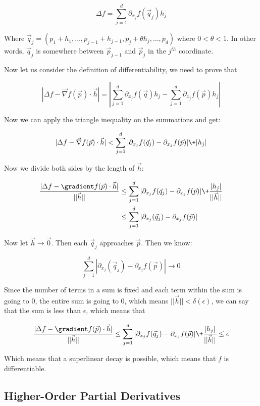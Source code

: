 \documentclass[11 pt, twoside]{article}
\begin{document}
$$\Delta f = \sum_{j=1}^d \partial_{x_j} f(\vec{q}_j) h_j$$

Where $\vec{q}_j = (p_1 + h_1, \dots, p_{j-1} + h_{j-1}, p_j + \theta h_j,
\dots, p_d)$ where $0 < \theta < 1$. In other words, $\vec{q}_j$ is somewhere
between $\vec{p}_{j-1}$ and $\vec{p}_{j}$ in the $j^{th}$ coordinate.

Now let us consider the definition of differentiability, we need to prove that 


$$|\Delta f - \vec{\nabla}f(\vec{p}) \cdot \vec{h}| = |\sum_{j = 1}^d
\partial_{x_j} f(\vec{q}) h_j - \sum_{j = 1}^d \partial_{x_j} f(\vec{p}) h_j|$$

Now we can apply the triangle inequality on the summations and get:

$$|\Delta f - \vec{\nabla}f(\vec{p}) \cdot \vec{h}| < \sum_{j=1}^d |\partial_{x_j} f(\vec{q}_j) - \partial_{x_j} f(\vec{p})|
\+ |h_j|$$

Now we divide both sides by the length of $\vec{h}$:

\begin{align*}
\frac{|\Delta f - \gradient f(\vec{p}) \cdot \vec{h}|}{||\vec{h}||} &\leq
\sum_{j=1}^d |\partial_{x_j} f(\vec{q}_j) - \partial_{x_j} f(\vec{p})| \+
\frac{|h_j|}{||\vec{h}||}\\
&\leq \sum_{j=1}^d |\partial_{x_j} (\vec{q}_j) - \partial_{x_j} f(\vec{p})|
\end{align*}

Now let $\vec{h} \to \vec{0}$. Then each $\vec{q}_j$ approaches $\vec{p}$. Then
we know:

$$\sum_{j=1}^d |\partial_{x_j} (\vec{q}_j) - \partial_{x_j} f(\vec{p})| \to 0$$

Since the number of terms in a sum is fixed and each term within the sum is
going to 0, the entire sum is going to 0, which means $||\vec{h}|| <
\delta(\epsilon)$, we can say that the sum is less than $\epsilon$, which
means that

$$\frac{|\Delta f - \gradient f(\vec{p}) \cdot \vec{h}|}{||\vec{h}||} \leq
\sum_{j=1}^d |\partial_{x_j} f(\vec{q}_j) - \partial_{x_j} f(\vec{p})| \+
\frac{|h_j|}{||\vec{h}||} \leq \epsilon$$

Which means that a superlinear decay is possible, which means that $f$ is
differentiable.

\subsection{Higher-Order Partial Derivatives}
\end{document}
